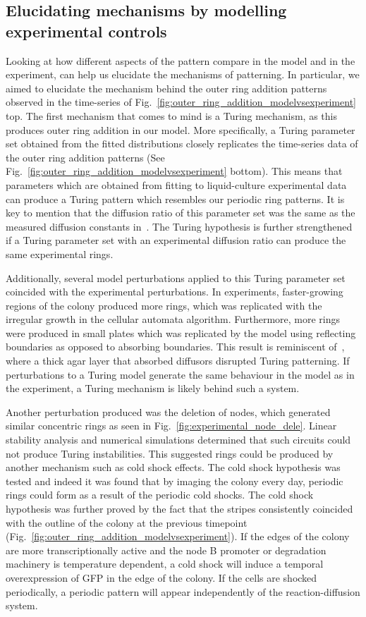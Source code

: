 \subsection{Elucidating mechanisms by modelling experimental controls}
Looking at how different aspects of the pattern compare in the model and in the experiment, can help us elucidate the mechanisms of patterning.
In particular, we aimed to elucidate the mechanism behind the outer ring addition patterns observed in the time-series of Fig.~\ref{fig:outer_ring_addition_modelvsexperiment} top.
The first mechanism that comes to mind is a Turing mechanism, as this produces outer ring addition in our model.
More specifically, a Turing parameter set obtained from the fitted distributions closely replicates the time-series data of the outer ring addition patterns (See Fig.~\ref{fig:outer_ring_addition_modelvsexperiment} bottom).
This means that parameters which are obtained from fitting to liquid-culture experimental data can produce a Turing pattern which resembles our periodic ring patterns.
It is key to mention that the diffusion ratio of this parameter set was the same as the measured diffusion constants in~\cite{tica_diffusers}.
The Turing hypothesis is further strengthened if a Turing parameter set with an experimental diffusion ratio can produce the same experimental rings.

Additionally, several model perturbations applied to this Turing parameter set coincided with the experimental perturbations.
In experiments, faster-growing regions of the colony produced more rings, which was replicated with the irregular growth in the cellular automata algorithm.
Furthermore, more rings were produced in small plates which was replicated by the model using reflecting boundaries as opposed to absorbing boundaries.
This result is reminiscent of~\cite{Krause2020}, where a thick agar layer that absorbed diffusors disrupted Turing patterning.
If perturbations to a Turing model generate the same behaviour in the model as in the experiment, a Turing mechanism is likely behind such a system.

Another perturbation produced was the deletion of nodes, which generated similar concentric rings as seen in Fig.~\ref{fig:experimental_node_dele}.
Linear stability analysis and numerical simulations determined that such circuits could not produce Turing instabilities.
This suggested rings could be produced by another mechanism such as cold shock effects.
The cold shock hypothesis was tested and indeed it was found that by imaging the colony every day, periodic rings could form as a result of the periodic cold shocks.
The cold shock hypothesis was further proved by the fact that the stripes consistently coincided with the outline of the colony at the previous timepoint (Fig.~\ref{fig:outer_ring_addition_modelvsexperiment}).
If the edges of the colony are more transcriptionally active and the node B promoter or degradation machinery is temperature dependent, a cold shock will induce a temporal overexpression of GFP in the edge of the colony.
If the cells are shocked periodically, a periodic pattern will appear independently of the reaction-diffusion system.

